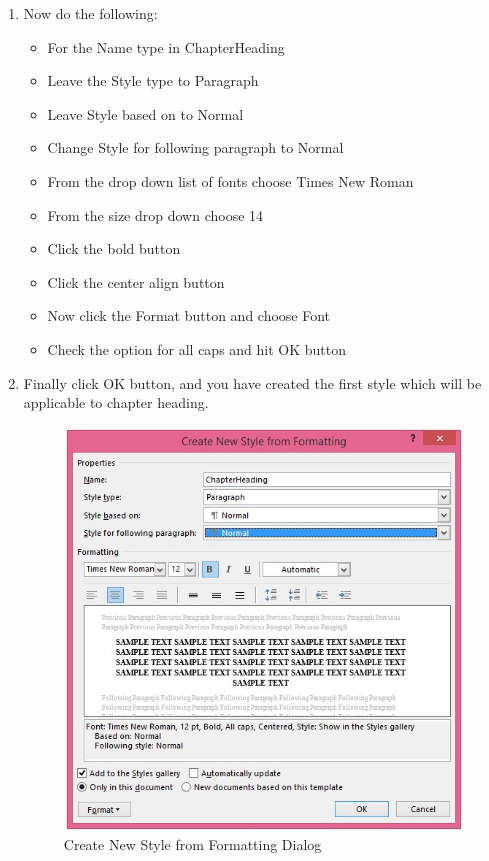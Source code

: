 \begin{enumerate}
    \item Now do the following:
    \begin{itemize}
        \item For the Name type in ChapterHeading
        \item Leave the Style type to Paragraph
        \item Leave Style based on to Normal
        \item Change Style for following paragraph to Normal
        \item From the drop down list of fonts choose Times New Roman
        \item From the size drop down choose 14
        \item Click the bold button
        \item Click the center align button
        \item Now click the Format button and choose Font
        \item Check the option for all caps and hit OK button
    \end{itemize}
    \item Finally click OK button, and you have created the first style which will be applicable to chapter heading.
    \begin{figure}
        \centering
        \includegraphics[scale=0.6]{./Figures/chapterheading.jpg}
        \caption{Create New Style from Formatting Dialog}
        \label{fig:chapterheading}
    \end{figure}
\end{enumerate}
    
